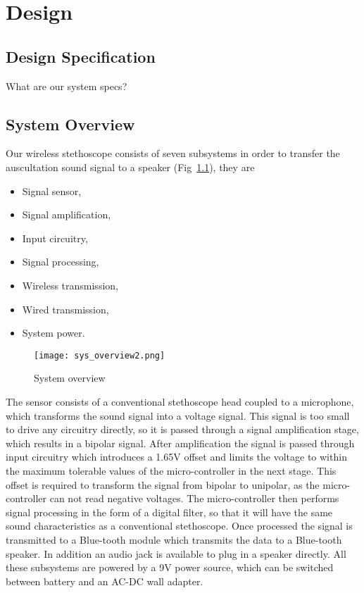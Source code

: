 \chapter{Design} \label{design}

\section{Design Specification}
What are our system specs?

\section{System Overview}
Our wireless stethoscope consists of seven subsystems in order to transfer the auscultation sound signal to a speaker (Fig~\ref{fig:sys_overview}), they are
\begin{itemize}
	\item Signal sensor,
	\item Signal amplification,
	\item Input circuitry,
	\item Signal processing,
	\item Wireless transmission,
	\item Wired transmission,
	\item System power.
\end{itemize}

\begin{figure}[!ht]
	\centering
	
		\texttt{[image: sys\_overview2.png]}
	
	\caption{System overview}
	\label{fig:sys_overview}
\end{figure}

The sensor consists of a conventional stethoscope head coupled to a microphone, which transforms the sound signal into a voltage signal. This signal is too small to drive any circuitry directly, so it is passed through a signal amplification stage, which results in a bipolar signal. After amplification the signal is passed through input circuitry which introduces a 1.65V offset and limits the voltage to within the maximum tolerable values of the micro-controller in the next stage. This offset is required to transform the signal from bipolar to unipolar, as the micro-controller can not read negative voltages. The micro-controller then performs signal processing in the form of a digital filter, so that it will have the same sound characteristics as a conventional stethoscope. Once processed the signal is transmitted to a Blue-tooth module which transmits the data to a Blue-tooth speaker. In addition an audio jack is available to plug in a speaker directly. All these subsystems are powered by a 9V power source, which can be switched between battery and an AC-DC wall adapter.

